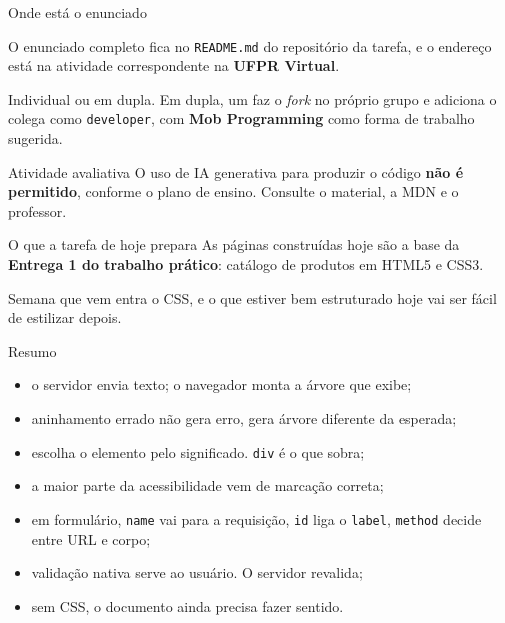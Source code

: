 \documentclass{beamer}
\begin{document}
\begin{frame}{Onde está o enunciado}
  \begin{block}{}
    O enunciado completo fica no \texttt{README.md} do repositório da tarefa, e o
    endereço está na atividade correspondente na \textbf{UFPR Virtual}.
  \end{block}

  \vspace{0.4cm}
  Individual ou em dupla. Em dupla, um faz o \textit{fork} no próprio grupo e
  adiciona o colega como \texttt{developer}, com \textbf{Mob Programming} como
  forma de trabalho sugerida.

  \vspace{0.4cm}
  \begin{alertblock}{Atividade avaliativa}
    O uso de IA generativa para produzir o código \textbf{não é permitido},
    conforme o plano de ensino. Consulte o material, a MDN e o professor.
  \end{alertblock}
\end{frame}

\begin{frame}{O que a tarefa de hoje prepara}
  As páginas construídas hoje são a base da \textbf{Entrega 1 do trabalho
  prático}: catálogo de produtos em HTML5 e CSS3.

  \vspace{0.5cm}
  Semana que vem entra o CSS, e o que estiver bem estruturado hoje vai ser fácil
  de estilizar depois.
\end{frame}

\begin{frame}{Resumo}
  \begin{itemize}
    \item o servidor envia texto; o navegador monta a árvore que exibe;
    \item aninhamento errado não gera erro, gera árvore diferente da esperada;
    \item escolha o elemento pelo significado. \texttt{div} é o que sobra;
    \item a maior parte da acessibilidade vem de marcação correta;
    \item em formulário, \texttt{name} vai para a requisição, \texttt{id} liga
          o \texttt{label}, \texttt{method} decide entre URL e corpo;
    \item validação nativa serve ao usuário. O servidor revalida;
    \item sem CSS, o documento ainda precisa fazer sentido.
  \end{itemize}
\end{frame}
\end{document}
